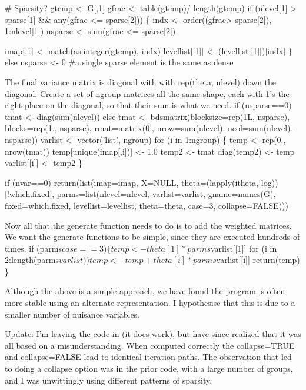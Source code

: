 \documentclass{article}
\begin{document}
# Sparsity?
gtemp <- G[,1]
gfrac <- table(gtemp)/ length(gtemp)
if (nlevel[1] > sparse[1] && any(gfrac <= sparse[2])) \{
    indx <- order((gfrac> sparse[2]), 1:nlevel[1])
    nsparse <- sum(gfrac <= sparse[2])

    imap[,1] <- match(as.integer(gtemp), indx) 
    levellist[[1]] <- (levellist[[1]])[indx]
    \}
else  nsparse <- 0  #a single sparse element is the same as dense
\nwendcode{}\nwdocspar

The final variance matrix is diagonal with with rep(theta, nlevel)
down the diagonal.  Create a set of ngroup matrices all the same shape,
each with 1's the right place on the diagonal, so that their sum is %
what we need.
\nwenddocs{}\plusendmoddef
if (nsparse==0) tmat <- diag(sum(nlevel))
else tmat <- bdsmatrix(blocksize=rep(1L, nsparse), blocks=rep(1., nsparse),
                   rmat=matrix(0., nrow=sum(nlevel), ncol=sum(nlevel)-nsparse))
varlist <- vector('list', ngroup) 
for (i in 1:ngroup) \{
    temp <- rep(0., nrow(tmat))
    temp[unique(imap[,i])] <- 1.0
    temp2 <- tmat
    diag(temp2) <- temp
    varlist[[i]] <- temp2
    \}

if (nvar==0) 
    return(list(imap=imap, X=NULL, 
                theta=(lapply(itheta, log))[!which.fixed],
                parms=list(nlevel=nlevel, varlist=varlist, gname=names(G),
                           fixed=which.fixed, levellist=levellist, 
                           theta=theta, case=3, collapse=FALSE)))          
\nwendcode{}\nwdocspar

Now all that the generate function needs to do is to
add the weighted matrices.  
We want the generate functions to be simple, since they are executed hundreds
of times.
\nwenddocs{}\endmoddef
if (parms$case==3) \{
    temp <- theta[1]* parms$varlist[[1]]
    for (i in 2:length(parms$varlist)) 
        temp <- temp + theta[i]*parms$varlist[[i]]
    return(temp)
    \}
\nwendcode{}   

Although the above is a simple approach, we have found the program 
is often more stable using an alternate
representation. 
I hypothesise that this is due to a smaller number of nuisance
variables. 

Update: I'm leaving the code in (it does work), but have since realized that %
it was all based on a misunderstanding.  When computed correctly the
collapse=TRUE and collapse=FALSE lead to identical iteration paths.
The observation that led to doing a collapse option was in the prior code,
with a large number of groups, and I was unwittingly using different patterns
of sparsity.
\end{document}
